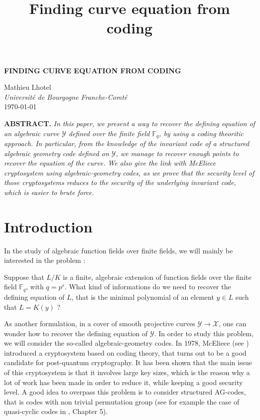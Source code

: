 \documentclass[10pt]{article}
\title{Finding curve equation from coding}
\newcommand{\s}{\vspace{0.3cm}}
\newcommand{\fq}{\mathbb{F}_q}
\newcommand{\X}{\mathcal{X}}
\newcommand{\Y}{\mathcal{Y}}
\begin{document}
\s
\begin{titlepage}

  \begin{center}
  		
        \vspace*{5cm}
 		\textbf{\bf{\Large{FINDING CURVE EQUATION FROM CODING}}}

 		\vspace*{1cm}

  \large{Mathieu Lhotel} \\
  \large{\it{Université de Bourgogne Franche-Comté}}\\
  \large{\today}
    \end{center}

\vspace*{2cm}

\textbf{ABSTRACT.} \text{} 
\it In this paper, we present a way to recover the defining equation of an algebraic curve $\Y$ defined over the finite field $\fq$, by using a coding theoritic approach. In particular, from the knowledge of the invariant code of a structured algebraic geometry code defined on $\Y$, we manage to recover enough points to recover the equation of the curve. We also give the link with McEliece cryptosystem using algebraic-geometry codes, as we prove that the security level of those cryptosystems reduces to the security of the underlying invariant code, which is easier to brute force.


\end{titlepage}



\section{Introduction}

\s

In the study of algebraic function fields over finite fields, we will mainly be interested in the problem : 

\s

Suppose that $L/K$ is a finite, algebraic extension of function fields over the finite field $\fq$, with $q=p^s$. What kind of informations do we need to recover the defining equation of $L$, that is the minimal polynomial of an element $y \in L$ such that $L=K(y)$ ?

\s

As another formulation, in a cover of smooth projective curves $\Y \rightarrow \X$, one can wonder how to recover the defining equation of $\Y$. In order to study this problem, we will consider the so-called algebraic-geometry codes. In 1978, McEliece  (see \cite{McE}) introduced a cryptosystem based on coding theory, that turns out to be a good candidate for post-quantum cryptography. It has been shown that the main issue of this cryptosystem is that it involves large key sizes, which is the reason why a lot of work has been made in order to reduce it, while keeping a good security level. A good idea to overpass this problem is to consider structured AG-codes, that is codes with non trivial permutation group (see for example the case of quasi-cyclic codes in \cite{Bar}, Chapter 5).  
\end{document}
